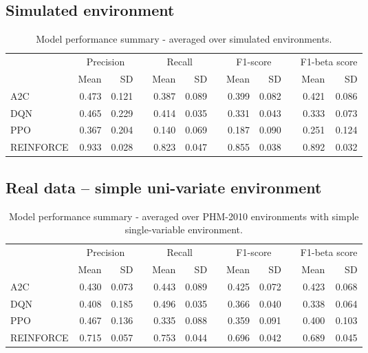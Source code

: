 \documentclass[a4paper, 12pt]{article}
\newcommand{\rowspace}[1]{\renewcommand{\arraystretch}{#1}}
\begin{document}
\subsection{Simulated environment}
\begin{table}[hbt!]\centering\sffamily
	\rowspace{1.3}
	\begin{tabular}{@{}l rr c rr c rr c rr@{}}
		\arrayrulecolor{black!40}\toprule
		& \multicolumn{2}{c}{Precision} & \phantom{i} & \multicolumn{2}{c}{Recall} & \phantom{i} & \multicolumn{2}{c}{F1-score} & \phantom{i} & \multicolumn{2}{c}{F1-beta score} \\
		\cmidrule{2-3} \cmidrule{5-6} \cmidrule{8-9} \cmidrule{11-12} 
		
		&Mean &SD & &Mean &SD & &Mean &SD& &Mean & SD\\ \midrule
		A2C & 0.473 & 0.121 & &0.387 & 0.089 & & 0.399 & 0.082 & &0.421 &0.086 \\
		DQN & 0.465 & 0.229 & &0.414 & 0.035 & & 0.331 & 0.043 & &0.333 &0.073 \\
		PPO & 0.367 & 0.204 & &0.140 & 0.069 & & 0.187 & 0.090 & &0.251 &0.124 \\
		REINFORCE & 0.933 & 0.028 & &0.823 & 0.047 & & 0.855 & 0.038 & &0.892 &0.032 \\
		
		\bottomrule
	\end{tabular}
	\caption{Model performance summary - averaged over simulated environments.}
	\label{tbl:SimulatedEnv}
\end{table}

\newpage
\subsection{Real data -- simple uni-variate environment}
\begin{table}[h]\centering
	\sffamily
	\rowspace{1.3}
	\begin{tabular}{@{}l rr c rr c rr c rr@{}}
		\arrayrulecolor{black!40}\toprule
		& \multicolumn{2}{c}{Precision} & \phantom{i} & \multicolumn{2}{c}{Recall} & \phantom{i} & \multicolumn{2}{c}{F1-score} & \phantom{i} & \multicolumn{2}{c}{F1-beta score} \\
		\cmidrule{2-3} \cmidrule{5-6} \cmidrule{8-9} \cmidrule{11-12} 
		
		&Mean &SD & &Mean &SD & &Mean &SD& &Mean & SD\\ \midrule
		A2C & 0.430 & 0.073 & &0.443 & 0.089 & & 0.425 & 0.072 & &0.423 &0.068 \\
		DQN & 0.408 & 0.185 & &0.496 & 0.035 & & 0.366 & 0.040 & &0.338 &0.064 \\
		PPO & 0.467 & 0.136 & &0.335 & 0.088 & & 0.359 & 0.091 & &0.400 &0.103 \\
		REINFORCE & 0.715 & 0.057 & &0.753 & 0.044 & & 0.696 & 0.042 & &0.689 &0.045 \\
		
		\bottomrule
	\end{tabular}
	\caption{Model performance summary - averaged over PHM-2010 environments with simple single-variable environment.}
	\label{tbl:PHMSS}
\end{table}
\end{document}
